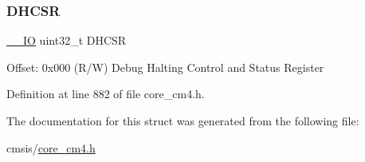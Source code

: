 \subsubsection{\texorpdfstring{D\+H\+C\+SR}{DHCSR}}
{\footnotesize\ttfamily \hyperlink{group___c_m_s_i_s__core__definitions_gaec43007d9998a0a0e01faede4133d6be}{\+\_\+\+\_\+\+IO} uint32\+\_\+t D\+H\+C\+SR}

Offset\+: 0x000 (R/W) Debug Halting Control and Status Register 

Definition at line 882 of file core\+\_\+cm4.\+h.



The documentation for this struct was generated from the following file\+:\begin{DoxyCompactItemize}
\item 
cmsis/\hyperlink{core__cm4_8h}{core\+\_\+cm4.\+h}\end{DoxyCompactItemize}
